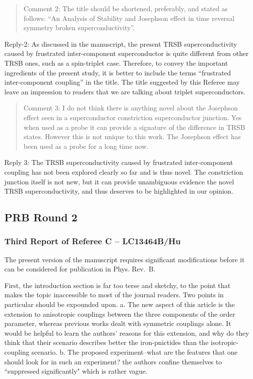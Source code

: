 \documentclass[11pt]{article}
\begin{document}
\begin{quote}
Comment 2: The title should be shortened, preferably, and stated as
follows: ``An Analysis of Stability and Josephson effect in time
reversal symmetry broken superconductivity''.
\end{quote}

Reply-2: As discussed in the manuscript, the present TRSB
superconductivity caused by frustrated inter-component superconductor is
quite different from other TRSB ones, such as a spin-triplet case.
Therefore, to convey the important ingredients of the present study, it
is better to include the terms ``frustrated inter-component coupling''
in the title. The title suggested by this Referee may leave an
impression to readers that we are talking about triplet superconductors.

\begin{quote}
Comment 3: I do not think there is anything novel about the Josephson
effect seen in a superconductor constriction superconductor junction.
Yes when used as a probe it can provide a signature of the difference in
TRSB states. However this is not unique to this work. The Josephson
effect has been used as a probe for a long time now.
\end{quote}

Reply 3: The TRSB superconductivity caused by frustrated inter-component
coupling has not been explored clearly so far and is thus novel. The
constriction junction itself is not new, but it can provide unambiguous
evidence the novel TRSB superconductivity, and thus deserves to be
highlighted in our opinion.

\hypertarget{prb-round-2}{%
\subsection{PRB Round 2}\label{prb-round-2}}

\hypertarget{third-report-of-referee-c-lc13464bhu}{%
\subsubsection{Third Report of Referee C --
LC13464B/Hu}\label{third-report-of-referee-c-lc13464bhu}}

The present version of the manuscript requires significant modifications
before it can be considered for publication in Phys. Rev.~B.

First, the introduction section is far too terse and sketchy, to the
point that makes the topic inaccessible to most of the journal readers.
Two points in particular should be expounded upon. a. The new aspect of
this article is the extension to anisotropic couplings between the three
components of the order parameter, whereas previous works dealt with
symmetric couplings alone. It would be helpful to learn the authors'
reasons for this extension, and why do they think that their scenario
describes better the iron-pnictides than the isotropic-coupling
scenario. b. The proposed experiment--what are the features that one
should look for in such an experiment? the authors confine themselves to
``suppressed significantly" which is rather vague.
\end{document}

